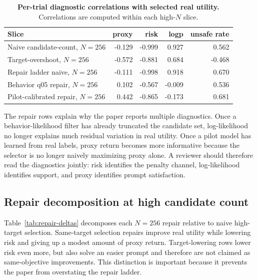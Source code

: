 \begin{table}[t]
\centering
\small
\caption{\textbf{Per-trial diagnostic correlations with selected real utility.} Correlations are computed within each high-$N$ slice.}
\label{tab:corrs}
\begin{tabular}{lrrrr}
\toprule
Slice & proxy & risk & logp & unsafe rate \\
\midrule
Naive candidate-count, $N=256$ & -0.129 & -0.999 & 0.927 & 0.562 \\
Target-overshoot, $N=256$ & -0.572 & -0.881 & 0.684 & -0.468 \\
Repair ladder naive, $N=256$ & -0.111 & -0.998 & 0.918 & 0.670 \\
Behavior q05 repair, $N=256$ & 0.102 & -0.567 & -0.009 & 0.536 \\
Pilot-calibrated repair, $N=256$ & 0.442 & -0.865 & -0.173 & 0.681 \\
\bottomrule
\end{tabular}
\end{table}

The repair rows explain why the paper reports multiple diagnostics. Once a behavior-likelihood filter has already truncated the candidate set, log-likelihood no longer explains much residual variation in real utility. Once a pilot model has learned from real labels, proxy return becomes more informative because the selector is no longer naively maximizing proxy alone. A reviewer should therefore read the diagnostics jointly: risk identifies the penalty channel, log-likelihood identifies support, and proxy identifies prompt satisfaction.

\subsection{Repair decomposition at high candidate count}

Table~\ref{tab:repair-deltas} decomposes each $N=256$ repair relative to naive high-target selection. Same-target selection repairs improve real utility while lowering risk and giving up a modest amount of proxy return. Target-lowering rows lower risk even more, but also solve an easier prompt and therefore are not claimed as same-objective improvements. This distinction is important because it prevents the paper from overstating the repair ladder.

